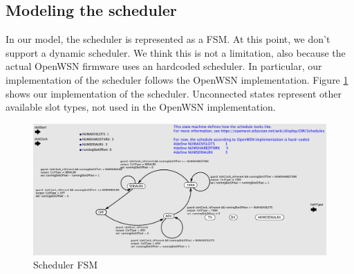 \subsection{Modeling the scheduler}
\label{sec:modeling-scheduler}
In our model, the scheduler is represented as a FSM. At this point, we don't support a dynamic scheduler. We think this is not a limitation, also because the actual OpenWSN firmware uses an hardcoded scheduler. In particular, our implementation of the scheduler follows the OpenWSN implementation. Figure \ref{fig:scheduler} shows our implementation of the scheduler. Unconnected states represent other available slot types, not used in the OpenWSN implementation.

\begin{figure}
  \centering
  \includegraphics[width=\textwidth]{figures/Scheduler.pdf}
  \caption{Scheduler FSM}
  \label{fig:scheduler}
\end{figure}

